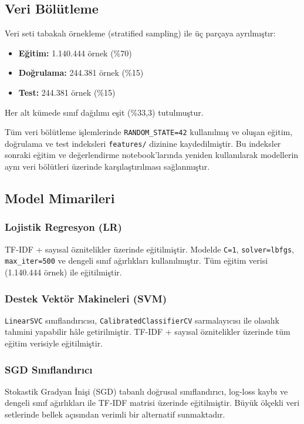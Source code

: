\documentclass[conference]{IEEEtran}
\begin{document}
\subsection{Veri Bölütleme}
Veri seti tabakalı örnekleme (stratified sampling) ile üç parçaya ayrılmıştır:
\begin{itemize}
    \item \textbf{Eğitim:} 1.140.444 örnek (\%70)
    \item \textbf{Doğrulama:} 244.381 örnek (\%15)
    \item \textbf{Test:} 244.381 örnek (\%15)
\end{itemize}
Her alt kümede sınıf dağılımı eşit (\%33,3) tutulmuştur.

Tüm veri bölütleme işlemlerinde \texttt{RANDOM\_STATE=42} kullanılmış ve oluşan eğitim, doğrulama ve test indeksleri \texttt{features/} dizinine kaydedilmiştir. Bu indeksler sonraki eğitim ve değerlendirme notebook'larında yeniden kullanılarak modellerin aynı veri bölütleri üzerinde karşılaştırılması sağlanmıştır.

\subsection{Model Mimarileri}

\subsubsection{Lojistik Regresyon (LR)}
TF-IDF + sayısal öznitelikler üzerinde eğitilmiştir. Modelde \texttt{C=1}, \texttt{solver=lbfgs}, \texttt{max\_iter=500} ve dengeli sınıf ağırlıkları kullanılmıştır. Tüm eğitim verisi (1.140.444 örnek) ile eğitilmiştir.

\subsubsection{Destek Vektör Makineleri (SVM)}
\texttt{LinearSVC} sınıflandırıcısı, \texttt{CalibratedClassifierCV} sarmalayıcısı ile olasılık tahmini yapabilir hâle getirilmiştir. TF-IDF + sayısal öznitelikler üzerinde tüm eğitim verisiyle eğitilmiştir.

\subsubsection{SGD Sınıflandırıcı}
Stokastik Gradyan İnişi (SGD) tabanlı doğrusal sınıflandırıcı, log-loss kaybı ve dengeli sınıf ağırlıkları ile TF-IDF matrisi üzerinde eğitilmiştir. Büyük ölçekli veri setlerinde bellek açısından verimli bir alternatif sunmaktadır.
\end{document}
